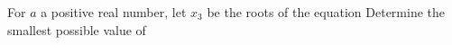 For $a$ a positive real number, let   $x_3$ be the roots of the equation   Determine the smallest possible value of 